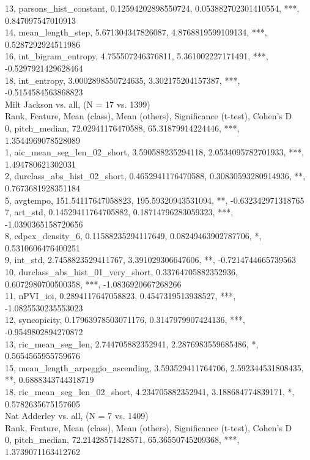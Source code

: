 13, parsons_hist_constant, 0.12594202898550724, 0.053882702301410554, ***, 0.847097547010913\\
14, mean_length_step, 5.671304347826087, 4.8768819599109134, ***, 0.5287292924511986\\
16, int_bigram_entropy, 4.755507246376811, 5.361002227171491, ***, -0.5297921429628464\\
18, int_entropy, 3.0002898550724635, 3.302175204157387, ***, -0.5154584563868823\\
Milt Jackson vs. all, (N = 17 vs. 1399)\\
Rank, Feature, Mean (class), Mean (others), Significance (t-test), Cohen's D\\
0, pitch_median, 72.02941176470588, 65.31879914224446, ***, 1.3544969078528089\\
1, aic_mean_seg_len_02_short, 3.590588235294118, 2.0534095782701933, ***, 1.494780621302031\\
2, durclass_abs_hist_02_short, 0.4652941176470588, 0.30830593280914936, **, 0.7673681928351184\\
5, avgtempo, 151.54117647058823, 195.59320943531094, **, -0.632342971318765\\
7, art_std, 0.14529411764705882, 0.18714796283059323, ***, -1.0390365158720656\\
8, cdpcx_density_6, 0.11588235294117649, 0.08249463902787706, *, 0.5310606476400251\\
9, int_std, 2.7458823529411767, 3.391029306647606, **, -0.7214744665739563\\
10, durclass_abs_hist_01_very_short, 0.33764705882352936, 0.6072980700500358, ***, -1.0836920667268266\\
11, nPVI_ioi, 0.2894117647058823, 0.4547319513938527, ***, -1.0825530235553023\\
12, syncopicity, 0.17963978503071176, 0.3147979907424136, ***, -0.9549802894270872\\
13, ric_mean_seg_len, 2.744705882352941, 2.2876983559685486, *, 0.5654565955759676\\
15, mean_length_arpeggio_ascending, 3.593529411764706, 2.592344531808435, **, 0.6888343744318719\\
18, ric_mean_seg_len_02_short, 4.234705882352941, 3.188684774839171, *, 0.5782635675157605\\
Nat Adderley vs. all, (N = 7 vs. 1409)\\
Rank, Feature, Mean (class), Mean (others), Significance (t-test), Cohen's D\\
0, pitch_median, 72.21428571428571, 65.36550745209368, ***, 1.3739071163412762\\
